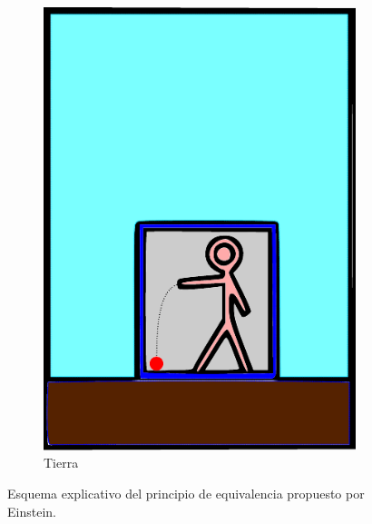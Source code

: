 \begin{figure}[!ht]
\begin{subfigure}{0.3\textwidth}
\includegraphics[width=\textwidth]{images/principio-equivalencia-2.pdf}
\caption{Tierra}
\end{subfigure}
\caption[Principio de equivalencia de Einstein]{Esquema explicativo del principio de equivalencia propuesto por Einstein.}
\label{fig:5}
\end{figure}

